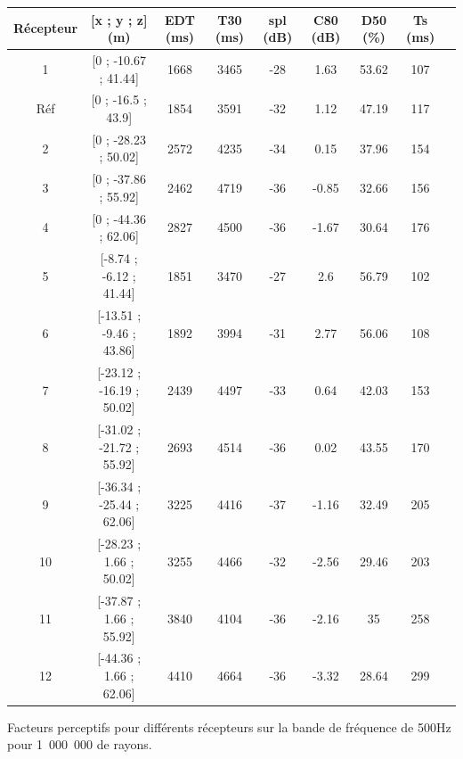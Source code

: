 \begin{tableth} 
\footnotesize
 \begin{tabular}{| *{9}{c|}} 
 \hline 
 Récepteur & [x ; y ; z] (m)  & \gls{EDT} (ms) & \gls{T30} (ms) & \gls{spl} (dB) & \gls{C80} (dB) & \gls{D50} (\%) & \gls{Ts} (ms) \\ %
 \hline 
 \hline 
1  & [0 ; -10.67 ; 41.44] &1668  &3465   &-28  &1.63  &53.62  &107 \\%
 \hline 
 Réf    &[0 ; -16.5 ; 43.9] &1854  &3591   &-32  &1.12  &47.19  &117 \\%
 \hline 
 2  & [0 ; -28.23 ; 50.02] &2572  &4235   &-34  &0.15  &37.96  &154 \\ %
 \hline 
 3  &  [0 ; -37.86 ; 55.92] &2462  &4719   &-36  &-0.85  &32.66  &156 \\ %
 \hline 
 4  &  [0 ; -44.36 ; 62.06] &2827  &4500   &-36  &-1.67  &30.64  &176 \\%
 \hline 
 \hline
 5  &   [-8.74 ; -6.12 ; 41.44] &1851  &3470   &-27  &2.6  &56.79  &102 \\%
 \hline 
 6  &  [-13.51 ; -9.46 ; 43.86] &1892  &3994   &-31  &2.77  &56.06  &108 \\%
  \hline 
  7 &   [-23.12 ; -16.19 ; 50.02] &2439  &4497   &-33  &0.64  &42.03  &153 \\ %
 \hline 
 8  &  [-31.02 ; -21.72 ; 55.92] &2693  &4514   &-36  &0.02  &43.55  &170 \\ %
 \hline 
 9  & [-36.34 ; -25.44 ; 62.06] &3225  &4416   &-37  &-1.16  &32.49  &205 \\ %
 \hline 
 \hline
 10  &  [-28.23 ; 1.66 ; 50.02] &3255  &4466   &-32  &-2.56  &29.46  &203 \\ %
 \hline 
11   & [-37.87 ; 1.66 ; 55.92] &3840  &4104   &-36  &-2.16  &35  &258 \\%
 \hline 
12   & [-44.36 ; 1.66 ; 62.06] &4410  &4664   &-36  &-3.32  &28.64  &299\\ %
 \hline 
\end{tabular} 
 \caption{Facteurs perceptifs pour différents récepteurs sur la bande de fréquence de 500Hz pour 1~000~000 de rayons.} 
 \label{tab_fac_rec} 
 \end{tableth}
 
